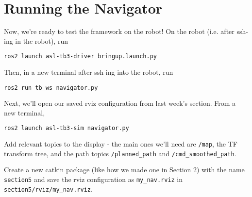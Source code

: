 \documentclass{article}
\begin{document}


\section{Running the Navigator}
Now, we're ready to test the framework on the robot!
On the robot (i.e. after ssh-ing in the robot), run

\begin{lstlisting}
ros2 launch asl-tb3-driver bringup.launch.py
\end{lstlisting}

Then, in a new terminal after ssh-ing into the robot, run

\begin{lstlisting}
ros2 run tb_ws navigator.py
\end{lstlisting}

Next, we'll open our saved rviz configuration from last week's section. From a new terminal, %
\begin{lstlisting}
ros2 launch asl-tb3-sim navigator.py
\end{lstlisting}



Add relevant topics to the display - the main ones we'll need are \texttt{/map}, the TF transform tree, and the path topics \texttt{/planned\_path} and \texttt{/cmd\_smoothed\_path}. 

Create a new catkin package (like how we made one in Section 2) with the name \texttt{section5} and save the rviz configuration as \texttt{my\_nav.rviz} in \texttt{section5/rviz/my\_nav.rviz}.
\end{document}
